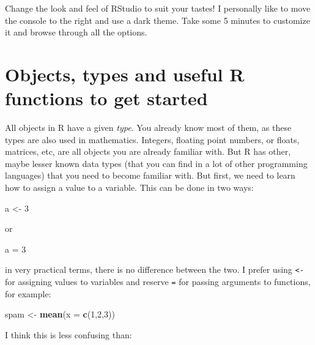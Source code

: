 \documentclass[
]{article}
\newenvironment{Shaded}{\begin{snugshade}}{\end{snugshade}}
\newcommand{\DataTypeTok}[1]{\textcolor[rgb]{0.13,0.29,0.53}{#1}}
\newcommand{\DecValTok}[1]{\textcolor[rgb]{0.00,0.00,0.81}{#1}}
\newcommand{\KeywordTok}[1]{\textcolor[rgb]{0.13,0.29,0.53}{\textbf{#1}}}
\newcommand{\NormalTok}[1]{#1}
\newcommand{\StringTok}[1]{\textcolor[rgb]{0.31,0.60,0.02}{#1}}
\begin{document}
Change the look and feel of RStudio to suit your tastes! I personally like to move the console
to the right and use a dark theme. Take some 5 minutes to customize it and browse through all the options.

\hypertarget{objects-types-and-useful-r-functions-to-get-started}{%
\section{Objects, types and useful R functions to get started}\label{objects-types-and-useful-r-functions-to-get-started}}

All objects in R have a given \emph{type}. You already know most of them, as these types are also used
in mathematics. Integers, floating point numbers, or floats, matrices, etc, are all objects you
are already familiar with. But R has other, maybe lesser known data types (that you can find in a
lot of other programming languages) that you need to become familiar with. But first, we need to
learn how to assign a value to a variable. This can be done in two ways:

\begin{Shaded}
\begin{Highlighting}[]
\NormalTok{a \textless{}{-}}\StringTok{ }\DecValTok{3}
\end{Highlighting}
\end{Shaded}

or

\begin{Shaded}
\begin{Highlighting}[]
\NormalTok{a =}\StringTok{ }\DecValTok{3}
\end{Highlighting}
\end{Shaded}

in very practical terms, there is no difference between the two. I prefer using \texttt{\textless{}-} for assigning
values to variables and reserve \texttt{=} for passing arguments to functions, for example:

\begin{Shaded}
\begin{Highlighting}[]
\NormalTok{spam \textless{}{-}}\StringTok{ }\KeywordTok{mean}\NormalTok{(}\DataTypeTok{x =} \KeywordTok{c}\NormalTok{(}\DecValTok{1}\NormalTok{,}\DecValTok{2}\NormalTok{,}\DecValTok{3}\NormalTok{))}
\end{Highlighting}
\end{Shaded}

I think this is less confusing than:
\end{document}

